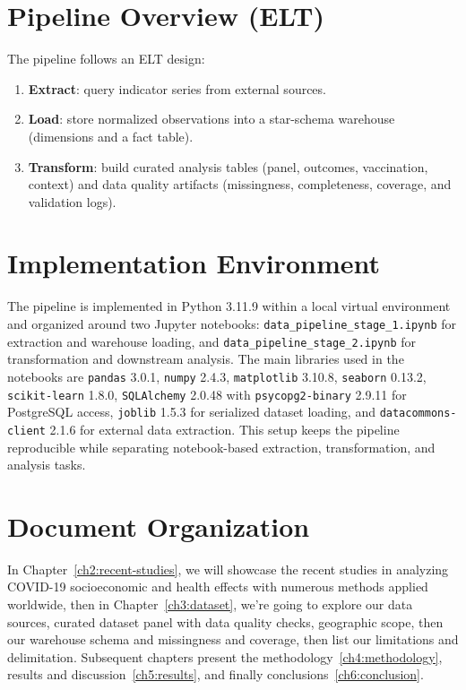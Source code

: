 \documentclass[a4paper]{report}
\begin{document}
\section{Pipeline Overview (ELT)}
The pipeline follows an ELT design:
\begin{enumerate}
    \item \textbf{Extract}: query indicator series from external sources.
    \item \textbf{Load}: store normalized observations into a star-schema warehouse (dimensions and a fact table).
    \item \textbf{Transform}: build curated analysis tables (panel, outcomes, vaccination, context) and data quality artifacts (missingness, completeness, coverage, and validation logs).
\end{enumerate}

\section{Implementation Environment}
The pipeline is implemented in Python 3.11.9 within a local virtual environment and organized around two Jupyter notebooks: \texttt{data\_pipeline\_stage\_1.ipynb} for extraction and warehouse loading, and \texttt{data\_pipeline\_stage\_2.ipynb} for transformation and downstream analysis. The main libraries used in the notebooks are \texttt{pandas} 3.0.1, \texttt{numpy} 2.4.3, \texttt{matplotlib} 3.10.8, \texttt{seaborn} 0.13.2, \texttt{scikit-learn} 1.8.0, \texttt{SQLAlchemy} 2.0.48 with \texttt{psycopg2-binary} 2.9.11 for PostgreSQL access, \texttt{joblib} 1.5.3 for serialized dataset loading, and \texttt{datacommons-client} 2.1.6 for external data extraction. This setup keeps the pipeline reproducible while separating notebook-based extraction, transformation, and analysis tasks.

\section{Document Organization}
In Chapter~\ref{ch2:recent-studies}, we will showcase the recent studies in analyzing COVID-19 socioeconomic and health effects with numerous methods applied worldwide, then in
Chapter~\ref{ch3:dataset}, we're going to explore our data sources, curated dataset panel with data quality checks, geographic scope, then our warehouse schema and missingness and coverage, then list our limitations and delimitation.
Subsequent chapters present the methodology~\ref{ch4:methodology}, results and discussion~\ref{ch5:results}, and finally conclusions~\ref{ch6:conclusion}.
\end{document}
